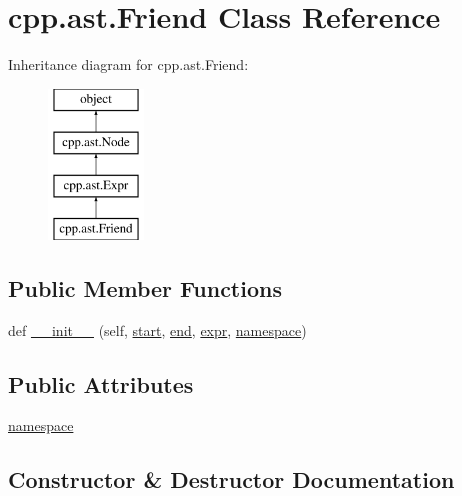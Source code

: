 \hypertarget{classcpp_1_1ast_1_1Friend}{}\section{cpp.\+ast.\+Friend Class Reference}
\label{classcpp_1_1ast_1_1Friend}
Inheritance diagram for cpp.\+ast.\+Friend\+:\begin{figure}[H]
\begin{center}
\leavevmode
\includegraphics[height=4.000000cm]{classcpp_1_1ast_1_1Friend}
\end{center}
\end{figure}
\subsection*{Public Member Functions}
\begin{DoxyCompactItemize}
\item 
def \mbox{\hyperlink{classcpp_1_1ast_1_1Friend_a9fe245d0f14eaab85435e942a56de7e6}{\+\_\+\+\_\+init\+\_\+\+\_\+}} (self, \mbox{\hyperlink{classcpp_1_1ast_1_1Node_a7b2aa97e6a049bb1a93aea48c48f1f44}{start}}, \mbox{\hyperlink{classcpp_1_1ast_1_1Node_a3c5e5246ccf619df28eca02e29d69647}{end}}, \mbox{\hyperlink{classcpp_1_1ast_1_1Expr_a2f4e13fb0176f2616f8703103c806462}{expr}}, \mbox{\hyperlink{classcpp_1_1ast_1_1Friend_a076c68dddae9bd1e24d224d005538014}{namespace}})
\end{DoxyCompactItemize}
\subsection*{Public Attributes}
\begin{DoxyCompactItemize}
\item 
\mbox{\hyperlink{classcpp_1_1ast_1_1Friend_a076c68dddae9bd1e24d224d005538014}{namespace}}
\end{DoxyCompactItemize}


\subsection{Constructor \& Destructor Documentation}
\mbox{\label{classcpp_1_1ast_1_1Friend_a9fe245d0f14eaab85435e942a56de7e6}} 
